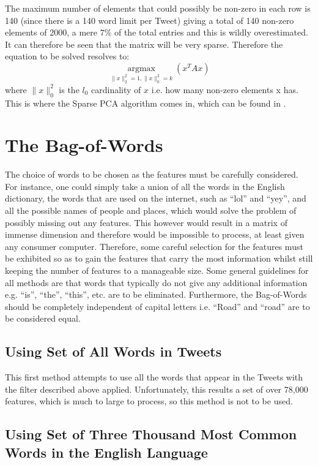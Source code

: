 \documentclass[11pt,a4paper]{article}
\begin{document}
The maximum number of elements that could possibly be non-zero in each row is 140 (since there is a 140 word limit per Tweet) giving a total of 140 non-zero elements of 2000, a mere $7\%$ of the total entries and this is wildly overestimated. It can therefore be seen that the matrix will be very sparse. Therefore the equation to be solved resolves to:
\begin{equation}
\underset{\|x\|_2^2 = 1, \|x\|_0^2 = k}{\operatorname{argmax}}\left( x^TAx\right)
\end{equation}
where $\|x\|_0^2$ is the $l_0$ cardinality of $x$ i.e. how many non-zero elements x has. This is where the Sparse PCA algorithm comes in, which can be found in \cite{dimakis}.


\section{The Bag-of-Words}
The choice of words to be chosen as the features must be carefully considered. For instance, one could simply take a union of all the words in the English dictionary, the words that are used on the internet, such as ``lol'' and ``yey'', and all the possible names of people and places, which would solve the problem of possibly missing out any features. This however would result in a matrix of immense dimension and therefore would be impossible to process, at least given any consumer computer. Therefore, some careful selection for the features must be exhibited so as to gain the features that carry the most information whilst still keeping the number of features to a manageable size. Some general guidelines for all methods are that words that typically do not give any additional information e.g. ``is'', ``the'', ``this'', etc. are to be eliminated. Furthermore, the Bag-of-Words should be completely independent of capital letters i.e. ``Road'' and ``road'' are to be considered equal.
\subsection{Using Set of All Words in Tweets}
This first method attempts to use all the words that appear in the Tweets with the filter described above applied. Unfortunately, this results a set of over 78,000 features, which is much to large to process, so this method is not to be used. 
\subsection{Using Set of Three Thousand Most Common Words in the English Language}
\end{document}
